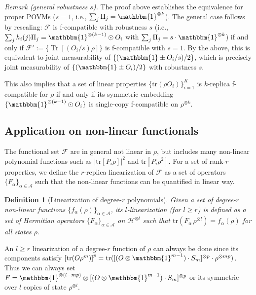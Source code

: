\documentclass[aps,%
twocolumn,%
floatfix,%
pra,%
amsfonts,%
groupedaddress,%
superscriptaddress]{revtex4-2}%
\newtheorem{lemma}{Lemma}
\newtheorem{definition}{Definition}[section]
\DeclareMathOperator{\tr}{Tr}
\newcommand{\ox}{\otimes}
\newcommand{\1}{\mathbbm{1}}
\newcommand*{\cF}{\mathcal{F}}
\newcommand*{\cH}{\mathcal{H}}
\begin{document}
\color{red}
\emph{Remark (general robustness $s$).}
The proof above establishes the equivalence for proper POVMs ($s=1$, i.e., $\sum_j \Pi_j = \1^{\otimes k}$). The general case follows by rescaling: $\cF$ is f-compatible with robustness $s$ (i.e., $\sum_j h_i(j)\Pi_j = \1^{\otimes(k-1)}\odot O_i$ with $\sum_j \Pi_j = s\cdot\1^{\otimes k}$) if and only if $\cF' := \{\tr[(O_i/s)\rho]\}$ is f-compatible with $s=1$. By the above, this is equivalent to joint measurability of $\{(\1 \pm O_i/s)/2\}$, which is precisely joint measurability of $\{(\1 \pm O_i)/2\}$ with robustness $s$.
\color{black}

This also implies that a set of linear properties $\{\mathrm{tr}\left(\rho O_i\right)\}_{i = 1}^K$ is $k$-replica f-compatible for $\rho$ if and only if its symmetric embedding $\{\1^{\otimes (k-1)} \odot O_i\}$ is single-copy f-compatible on $\rho^{\otimes k}$.


\subsection{Application on non-linear functionals}
The functional set $\mathcal{F}$ are in general not linear in $\rho$, but includes many non-linear polynomial functions such as $|\mathrm{tr}[P_i\rho]|^2$ and $ \mathrm{tr}[P_i\rho^2]$.
For a set of rank-$r$ properties, we define the $r$-replica linearization of $\mathcal{F}$ as a set of operators $\{F_\alpha\}_{\alpha \in \mathcal{A}}$ such that the non-linear functions can be quantified in linear way.

\begin{definition}[Linearization of degree-$r$ polynomials]\label{def:linearization}
    Given a set of degree-$r$ non-linear functions $\{f_\alpha(\rho)\}_{\alpha \in \mathcal{A}}$, its $l$-linearization (for $l \geq r$) is defined as a set of Hermitian operators $\{F_\alpha\}_{\alpha \in \mathcal{A}}$ on $\cH^{\ox l}$ such that $\mathrm{tr}(F_{\alpha}\, \rho^{\otimes l}) = f_{\alpha}(\rho)$ for all states $\rho$.
\end{definition}
An $l \geq r$ linearization of a degree-$r$ function of $\rho$ can always be done since its components satisfy $\left[\mathrm{tr}(O \rho^{m})\right]^{p} = \mathrm{tr}([(O\otimes \1^{m-1})\cdot S_{m}]^{\otimes p} \cdot \rho^{\otimes m p})$.
 Thus we can always set $F = \1^{\otimes (l-mp)} \otimes [(O\otimes \1^{m-1}) \cdot S_{m}]^{\otimes p}$ or its symmetric over $l$ copies of state $\rho^{\otimes l}$.
\end{document}
